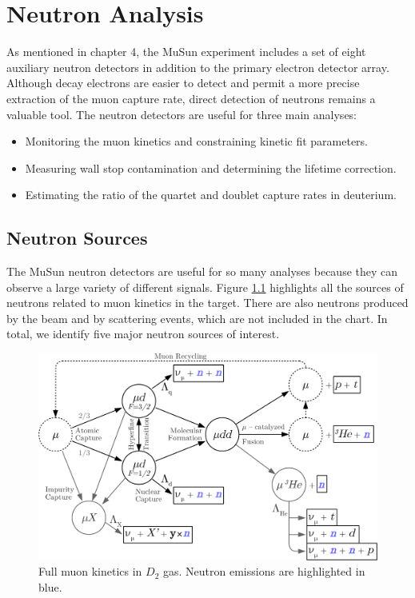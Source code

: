 \chapter{Neutron Analysis} \label{ch:neutrons}

As mentioned in chapter 4, the MuSun experiment includes a set of eight auxiliary neutron detectors in addition to the primary electron detector array. 
Although decay electrons are easier to detect and permit a more precise extraction of the muon capture rate, direct detection of neutrons remains a valuable tool. 
The neutron detectors are useful for three main analyses:
\begin{itemize}
  \item Monitoring the muon kinetics and constraining kinetic fit parameters.
  \item Measuring wall stop contamination and determining the lifetime correction.
  \item Estimating the ratio of the quartet and doublet capture rates in deuterium.
\end{itemize}

\section{Neutron Sources}

The MuSun neutron detectors are useful for so many analyses because they can observe a large variety of different signals.
Figure \ref{fig:kinetics_chart} highlights all the sources of neutrons related to muon kinetics in the target.
There are also neutrons produced by the beam and by scattering events, which are not included in the chart.
In total, we identify five major neutron sources of interest.

\begin{figure}[h]
  \includegraphics[width=\textwidth]{neutrons/figures/kinetics_neutrons_highlighted-crop.pdf}
  \caption{Full muon kinetics in $D_2$ gas. Neutron emissions are highlighted in blue.}
  \label{fig:kinetics_chart}
\end{figure}

